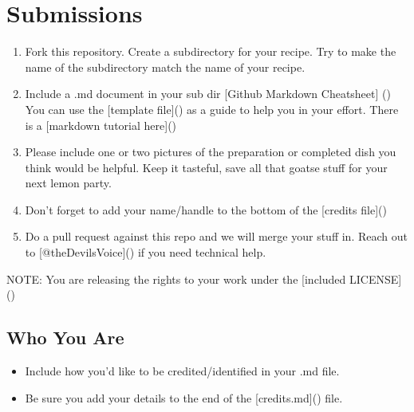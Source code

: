 \documentclass[letterpaper,10pt,english]{sphinxmanual}
\begin{document}
\chapter{Submissions}
\label{\detokenize{_source/submissions:submissions}}\label{\detokenize{_source/submissions::doc}}\begin{enumerate}
%
\item {} 
Fork this repository. Create a subdirectory for your recipe. Try to make the name of the subdirectory match the name of your recipe.

\item {} 
Include a .md document in your sub dir {[}Github Markdown Cheatsheet{]} () You can use the {[}template file{]}() as a guide to help you in your effort. There is a {[}markdown tutorial here{]}()

\item {} 
Please include one or two pictures of the preparation or completed dish you think would be helpful. Keep it tasteful, save all that goatse stuff for your next lemon party.

\item {} 
Don’t forget to add your name/handle to the bottom of the {[}credits file{]}()

\item {} 
Do a pull request against this repo and we will merge your stuff in. Reach out to {[}@theDevilsVoice{]}() if you need technical help.

\end{enumerate}

NOTE: You are releasing the rights to your work under the {[}included LICENSE{]}()


\section{Who You Are}
\label{\detokenize{_source/submissions:who-you-are}}\begin{itemize}
\item {} 
Include how you’d like to be credited/identified in your .md file.

\item {} 
Be sure you add your details to the end of the {[}credits.md{]}() file.

\end{itemize}
\end{document}
